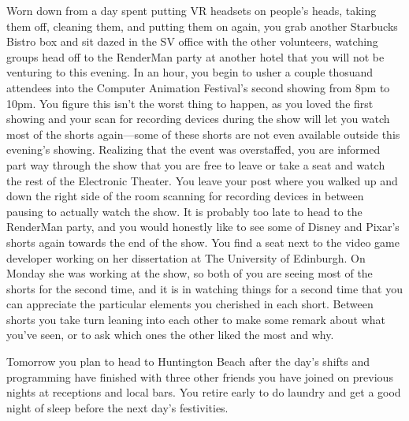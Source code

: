 \documentclass[../main.tex]{subfiles}
\begin{document}
Worn down from a day spent putting VR headsets on people's heads, taking them off, cleaning them, and putting them on again, you grab another Starbucks Bistro box and sit dazed in the SV office with the other volunteers, watching groups head off to the RenderMan party at another hotel that you will not be venturing to this evening. In an hour, you begin to usher a couple thosuand attendees into the Computer Animation Festival's second showing from 8pm to 10pm. You figure this isn't the worst thing to happen, as you loved the first showing and your scan for recording devices during the show will let you watch most of the shorts again---some of these shorts are not even available outside this evening's showing. Realizing that the event was overstaffed, you are informed part way through the show that you are free to leave or take a seat and watch the rest of the Electronic Theater. You leave your post where you walked up and down the right side of the room scanning for recording devices in between pausing to actually watch the show. It is probably too late to head to the RenderMan party, and you would honestly like to see some of Disney and Pixar's shorts again towards the end of the show. You find a seat next to the video game developer working on her dissertation at The University of Edinburgh. On Monday she was working at the show, so both of you are seeing most of the shorts for the second time, and it is in watching things for a second time that you can appreciate the particular elements you cherished in each short. Between shorts you take turn leaning into each other to make some remark about what you've seen, or to ask which ones the other liked the most and why.

Tomorrow you plan to head to Huntington Beach after the day's shifts and programming have finished with three other friends you have joined on previous nights at receptions and local bars. You retire early to do laundry and get a good night of sleep before the next day's festivities.
\end{document}
